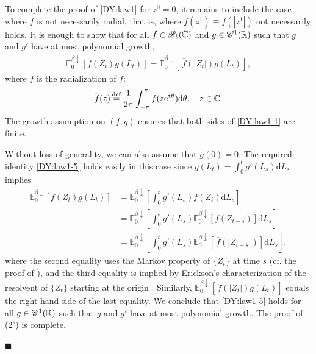\documentclass[12pt, twoside]{article}
\numberwithin{figure}{section}
\newcommand{\e}{{\mathrm e}}
\newcommand{\1}{\mathds 1}
\newcommand{\C}{{\mathscr C}}
\newcommand{\B}{\mathscr B}
\newcommand{\da}{{\downarrow}}
\newcommand{\E}{{\mathbb E}}
\renewcommand{\d}{{\mathrm d}}
\newcommand{\R}{{\Bbb R}}
\newcommand{\2}{{\mathbf 1}}
\renewcommand{\i}{{\mathtt i}}
\newcommand{\defeq}{{\stackrel{\rm def}{=}}}
\renewenvironment{proof}[1][\proofname]{\noindent {\bfseries #1.}\;}{\hfill\ensuremath{\blacksquare}\\}
\newcommand{\cc}{{^\circ}}
\begin{document}
\begin{proof}[Proof of Theorem~\ref{thm:formulas}]
 To complete the proof of \eqref{DY:law1} for $z^0=0$,  it remains to include the case where $f$ is not necessarily radial, that is, where $f(z^1)\equiv f(|z^1|)$ not necessarily holds. It is enough to show that for all $f\in\B_b(\Bbb C)$ and $g \in \C^1(\R)$ such that $g$ and $g'$ have at most polynomial growth,
\begin{align}\label{DY:law1-5}
\E^{\beta\da}_0[f(Z_t)g(L_t)]=\E^{\beta\da}_0[\,\overline{f}(|Z_t|)g(L_t)], 
\end{align}
where $\overline{f}$ is the radialization of $f$:
\begin{align}\label{def:radialization}
\overline{f}(z)\,\defeq\, \frac{1}{2\pi}\int_{-\pi}^\pi f(z\e^{\i \theta})\d \theta,\quad z\in \Bbb C.
\end{align}
The growth assumption on $(f,g)$ ensures that both sides of \eqref{DY:law1-1} are finite. 

Without loss of generality, we can also assume that $g(0)=0$. The required identity \eqref{DY:law1-5} holds easily in this case since 
$g(L_t)=\int_0^t g'(L_s)\d L_s$ implies
\begin{align*}
\E^{\beta\da}_0[f(Z_t)g(L_t)]&=\E_0^{\beta\da}\left[\int_0^t g'(L_s)f(Z_t)\d L_s\right]\\
&=\E_0^{\beta\da}\left[\int_0^t g'(L_s)\E^{\beta\da}_0[f(Z_{t-s})]\d L_s\right]\\
&=\E_0^{\beta\da}\left[\int_0^t g'(L_s)\E^{\beta\da}_0[\,\overline{f}(|Z_{t-s}|)]\d L_s\right],
\end{align*} 
where the second equality uses the Markov property of $\{Z_t\}$ at time $s$ (cf. the proof of \cite[Proposition~6.5]{C:BES}), and the third equality is implied by Erickson's characterization of the resolvent of $\{Z_t\}$ starting at the origin \cite[(2.3) on p.75]{Erickson}. Similarly, $\E^{\beta\da}_0[\,\overline{f}(|Z_t|)g(L_t)]$ equals the right-hand side of the last equality. We conclude that \eqref{DY:law1-5} holds for all $g \in \C^1(\R)$ such that $g$ and $g'$ have at most polynomial growth. The proof of (2$\cc$) is complete. \smallskip 


\end{proof}
\end{document}

